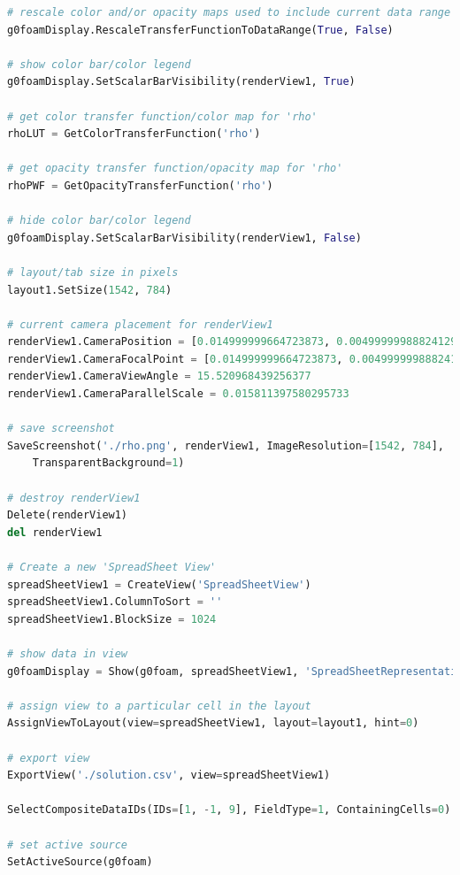 \documentclass[12pt]{article}
\begin{document}
\begin{lstlisting}[language=python, caption=Script for the generation of images and data from the CFD results., label=lst:ppost]
# rescale color and/or opacity maps used to include current data range
g0foamDisplay.RescaleTransferFunctionToDataRange(True, False)

# show color bar/color legend
g0foamDisplay.SetScalarBarVisibility(renderView1, True)

# get color transfer function/color map for 'rho'
rhoLUT = GetColorTransferFunction('rho')

# get opacity transfer function/opacity map for 'rho'
rhoPWF = GetOpacityTransferFunction('rho')

# hide color bar/color legend
g0foamDisplay.SetScalarBarVisibility(renderView1, False)

# layout/tab size in pixels
layout1.SetSize(1542, 784)

# current camera placement for renderView1
renderView1.CameraPosition = [0.014999999664723873, 0.004999999888241291, 0.06109054909012853]
renderView1.CameraFocalPoint = [0.014999999664723873, 0.004999999888241291, 0.0]
renderView1.CameraViewAngle = 15.520968439256377
renderView1.CameraParallelScale = 0.015811397580295733

# save screenshot
SaveScreenshot('./rho.png', renderView1, ImageResolution=[1542, 784],
    TransparentBackground=1)

# destroy renderView1
Delete(renderView1)
del renderView1

# Create a new 'SpreadSheet View'
spreadSheetView1 = CreateView('SpreadSheetView')
spreadSheetView1.ColumnToSort = ''
spreadSheetView1.BlockSize = 1024

# show data in view
g0foamDisplay = Show(g0foam, spreadSheetView1, 'SpreadSheetRepresentation')

# assign view to a particular cell in the layout
AssignViewToLayout(view=spreadSheetView1, layout=layout1, hint=0)

# export view
ExportView('./solution.csv', view=spreadSheetView1)

SelectCompositeDataIDs(IDs=[1, -1, 9], FieldType=1, ContainingCells=0)

# set active source
SetActiveSource(g0foam)
\end{lstlisting}
\end{document}
